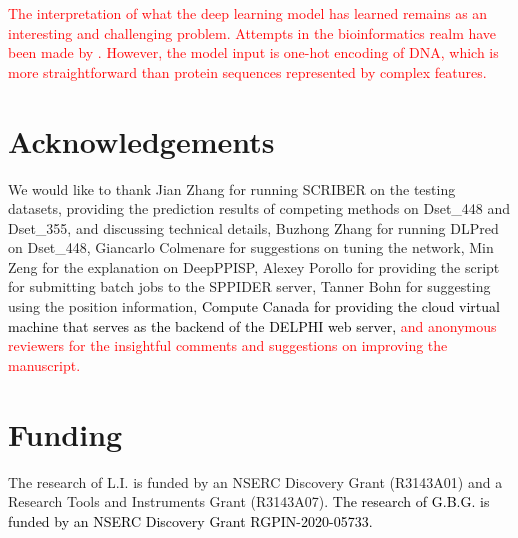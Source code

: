 \documentclass{bioinfo}
\newcommand{\mySecondColor}{black}
\newcommand{\mythirdColor}{red}
\begin{document}
\textcolor{\mythirdColor}{The interpretation of what the deep learning model has learned remains as an interesting and challenging problem. Attempts in the bioinformatics realm have been made by \cite{lanchantin2017deep}. However, the model input is one-hot encoding of DNA, which is more straightforward than protein sequences represented by complex features.}

\section*{Acknowledgements}
We would like to thank Jian Zhang for running SCRIBER on the testing datasets, providing the prediction results of competing methods on Dset\_448 and Dset\_355, and discussing technical details, Buzhong Zhang for running DLPred on Dset\_448, Giancarlo Colmenare for suggestions on tuning the network, Min Zeng for the explanation on DeepPPISP, Alexey Porollo for providing the script for submitting batch jobs to the SPPIDER server, Tanner Bohn for suggesting using the position information, \textcolor{\mySecondColor}{Compute Canada for providing the cloud virtual machine that serves as the backend of the DELPHI web server, \textcolor{\mythirdColor}{and anonymous reviewers for the insightful comments and suggestions on improving the manuscript.}}

\section*{Funding}
The research of L.I. is funded by an NSERC Discovery Grant (R3143A01) and a Research Tools and Instruments Grant (R3143A07). \textcolor{\mySecondColor}{The research of G.B.G. is funded by an NSERC Discovery Grant RGPIN-2020-05733.}



%

\end{document}
